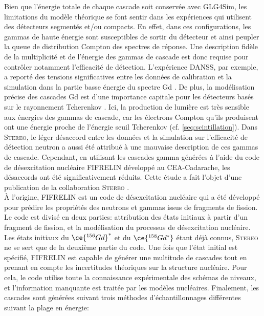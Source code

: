 Bien que l'énergie totale de chaque cascade soit conservée avec GLG4Sim, les limitations du modèle théorique se font sentir dans les expériences qui utilisent des détecteurs segmentés et/ou compacts. En effet, dans ces configurations, les gammas de haute énergie sont susceptibles de sortir du détecteur et ainsi peupler la queue de distribution Compton des spectres de réponse. Une description fidèle de la multiplicité et de l'énergie des gammas de cascade est donc requise pour contrôler notamment l'efficacité de détection. L'expérience DANSS, par exemple, a reporté des tensions significatives entre les données de calibration et la simulation dans la partie basse énergie du spectre Gd \cite{Alekseev:2018efk}. De plus, la modélisation précise des cascades Gd est d'une importance capitale pour les détecteurs basés sur le rayonnement Tcherenkov \cite{Hagiwara:2018kmr}. Ici, la production de lumière est très sensible aux énergies des gammas de cascade, car les électrons Compton qu'ils produisent ont une énergie proche de l'énergie seuil Tcherenkov (cf. \ref{seq:scintillation}). Dans \textsc{Stereo}, le léger désaccord entre les données et la simulation sur l'efficacité de détection neutron a aussi été attribué à une mauvaise description de ces gammas de cascade. Cependant, en utilisant les cascades gamma générées à l'aide du code de désexcitation nucléaire \og FIFRELIN \fg{} développé au CEA-Cadarache, les désaccords ont été significativement réduits. Cette étude a fait l'objet d'une publication de la collaboration \textsc{Stereo} \cite{AlmazanMolina:2019aoc}.\\

À l'origine, FIFRELIN est un code de désexcitation nucléaire qui a été développé pour prédire les propriétés des neutrons et gammas issus de fragments de fission. Le code est divisé en deux parties: attribution des états initiaux à partir d'un fragment de fission, et la modélisation du processus de désexcitation nucléaire. Les états initiaux du $\ce{^{156}Gd}^*$ et du $\ce{^{158}Gd^*}$ étant déjà connus, \textsc{Stereo} ne se sert que de la deuxième partie du code. Une fois que l'état initial est spécifié, FIFRELIN est capable de générer une multitude de cascades tout en prenant en compte les incertitudes théoriques sur la structure nucléaire. Pour cela, le code utilise toute la connaissance expérimentale des schémas de niveaux, et l'information manquante est traitée par les modèles nucléaires. Finalement, les cascades sont générées suivant trois méthodes d'échantillonnages différentes suivant la plage en énergie:\\

